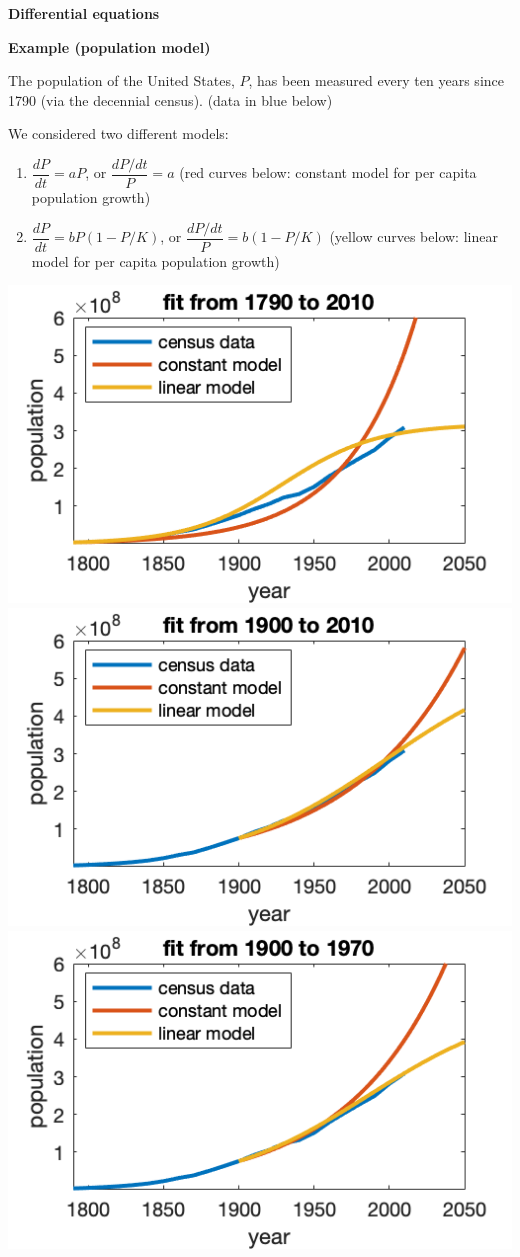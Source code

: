 \documentclass[12pt,letterpaper,noanswers]{exam}
\begin{document}



\noindent\textbf{Differential equations}


\noindent\textbf{Example (population model)}

The population of the United States, $P$, has been measured every ten years since 1790 (via the decennial census).  (data in blue below)

We considered two different models:
\begin{enumerate}
    \item $\dfrac{dP}{dt} = a P$, or $\dfrac{dP/dt}{P} = a$ (red curves below: constant model for per capita population growth)
    \item $\dfrac{dP}{dt} = b P(1-P/K)$, or $\dfrac{dP/dt}{P} = b(1-P/K)$ (yellow curves below: linear model for per capita population growth)
\end{enumerate}

\includegraphics[width=0.33\linewidth]{img/C31p1b.png}
\includegraphics[width=0.33\linewidth]{img/C31p1c.png}
\includegraphics[width=0.33\linewidth]{img/C31p1a.png}
\end{document}
